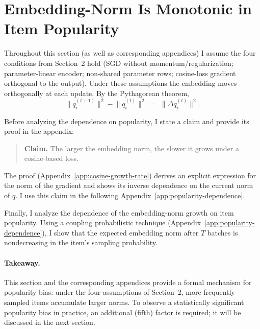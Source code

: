 \section{Embedding-Norm Is Monotonic in Item Popularity}

Throughout this section (as well as corresponding appendices) I assume the four conditions from Section~2 hold (SGD without momentum/regularization; parameter-linear encoder; non-shared parameter rows; cosine-loss gradient orthogonal to the output). Under these assumptions the embedding moves orthogonally at each update. By the Pythagorean theorem,
\begin{equation}
\label{eq:pythagoras-increment}
\bigl\|q_i^{(t+1)}\bigr\|^{2} - \bigl\|q_i^{(t)}\bigr\|^{2} \;=\; \bigl\|\Delta q_i^{(t)}\bigr\|^{2}.
\end{equation}

Before analyzing the dependence on popularity, I state a claim and provide its proof in the appendix:
\begin{quote}
\textbf{Claim.} The larger the embedding norm, the slower it grows under a cosine-based loss.
\end{quote}
The proof (Appendix~\ref{app:cosine-growth-rate}) derives an explicit expression for the norm of the gradient and shows its inverse dependence on the current norm of $q$.
I use this claim in the following Appendix~\ref{app:popularity-dependence}.

Finally, I analyze the dependence of the embedding-norm growth on item popularity. Using a coupling probabilistic technique (Appendix~\ref{app:popularity-dependence}), I show that the expected embedding norm after $T$ batches is nondecreasing in the item's sampling probability.

\paragraph{Takeaway.} This section and the corresponding appendices provide a formal mechanism for popularity bias: under the four assumptions of Section~2, more frequently sampled items accumulate larger norms. 
To observe a statistically significant popularity bias in practice, an additional (fifth) factor is required; it will be discussed in the next section.


